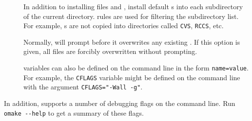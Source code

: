 \begin{description}
\item[] In addition to installing files  and ,
  install default s into each subdirectory of the current directory.
   rules are used for filtering the subdirectory list.  For example, s
  are not copied into directories called \verb+CVS+, \verb+RCCS+, etc.

\item[] Normally,  will prompt before it overwrites any
  existing .  If this option is given, all files are forcibly overwritten
  without prompting.

\item[]  variables can also be defined on the command
  line in the form \verb+name=value+.  For example, the \verb+CFLAGS+ variable might be defined
  on the command line with the argument \verb+CFLAGS="-Wall -g"+.
\end{description}

In addition,  supports a number of debugging flags on the command line. Run
\verb+omake --help+ to get a summary of these flags.

